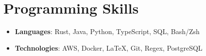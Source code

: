 \documentclass[letterpaper,11pt]{article}
\newcommand{\resumeSubHeadingListStart}{\begin{itemize}[leftmargin=*]}
\newcommand{\resumeSubHeadingListEnd}{\end{itemize}}
\begin{document}
\section{Programming Skills}
    \resumeSubHeadingListStart
        \item{
            \textbf{Languages}{: Rust, Java, Python, TypeScript, SQL, Bash/Zsh}
        }
        \vspace{-.3cm}
        \item{
            \textbf{Technologies}{: AWS, Docker, LaTeX, Git, Regex, PostgreSQL}
        }
    \resumeSubHeadingListEnd

\end{document}
